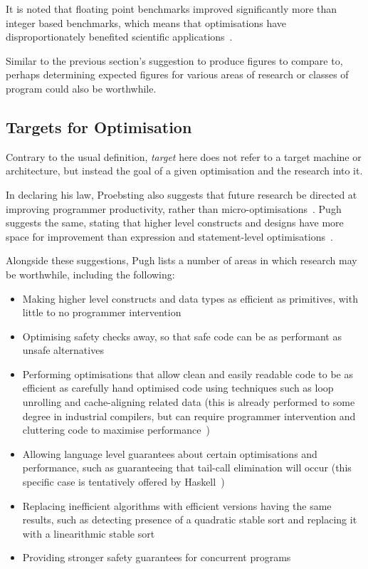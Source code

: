 It is noted that floating point benchmarks improved significantly more than integer based benchmarks, which means that optimisations have disproportionately benefited scientific applications~\cite{proebstingformal}.

Similar to the previous section's suggestion to produce figures to compare to, perhaps determining expected figures for various areas of research or classes of program could also be worthwhile.

\subsection{Targets for Optimisation}

Contrary to the usual definition, \textit{target} here does not refer to a target machine or architecture, but instead the goal of a given optimisation and the research into it.

In declaring his law, Proebsting also suggests that future research be directed at improving programmer productivity, rather than micro-optimisations~\cite{proebstingdecl}. Pugh suggests the same, stating that higher level constructs and designs have more space for improvement than expression and statement-level optimisations~\cite{optimisationrelevant}.

Alongside these suggestions, Pugh lists a number of areas in which research may be worthwhile, including the following:

\begin{itemize}
	\itemsep-0.25em
	\item Making higher level constructs and data types as efficient as primitives, with little to no programmer intervention
	\item Optimising safety checks away, so that safe code can be as performant as unsafe alternatives
	\item Performing optimisations that allow clean and easily readable code to be as efficient as carefully hand optimised code using techniques such as loop unrolling and cache-aligning related data (this is already performed to some degree in industrial compilers, but can require programmer intervention and cluttering code to maximise performance~\cite{gccloops})
	\item Allowing language level guarantees about certain optimisations and performance, such as guaranteeing that tail-call elimination will occur (this specific case is tentatively offered by Haskell~\cite{haskelltail})
	\item Replacing inefficient algorithms with efficient versions having the same results, such as detecting presence of a quadratic stable sort and replacing it with a linearithmic stable sort
	\item Providing stronger safety guarantees for concurrent programs
\end{itemize}

